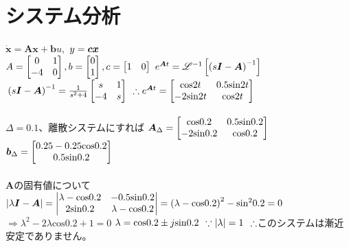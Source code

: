 \documentclass[12pt,a4paper]{article}
\begin{document}
\section{システム分析}
$\bm{\dot{x}}=\bm{Ax}+\bm{b}u,$
$\\y=\bm{cx}$
\\
$\\A=
\begin{bmatrix}
0 & 1\\
-4 & 0
\end{bmatrix},b=
\begin{bmatrix}
0\\
1
\end{bmatrix},c=
\begin{bmatrix}
1 & 0
\end{bmatrix}$
$\\e^{\bm{A}t}=\mathscr{L}^{-1}\left[\left(s\bm{I}-\bm{A}\right)^{-1}\right]$
$\\\left(s\bm{I}-\bm{A}\right)^{-1}=\frac{1}{s^2+4}
\begin{bmatrix}
s & 1\\
-4 & s
\end{bmatrix}$
$\\\therefore e^{\bm{A}t}=
\begin{bmatrix}
\mathrm{cos}2t & 0.5\mathrm{sin}2t\\
-2\mathrm{sin}2t & \mathrm{cos}2t
\end{bmatrix}$
\\
\\
$\Delta=0.1$、離散システムにすれば
$\\\bm{A}_\Delta=
\begin{bmatrix}
\mathrm{cos}0.2 & 0.5\mathrm{sin}0.2\\
-2\mathrm{sin}0.2 & \mathrm{cos}0.2
\end{bmatrix}$
$\\\bm{b}_\Delta=
\begin{bmatrix}
0.25-0.25\mathrm{cos}0.2\\
0.5\mathrm{sin}0.2
\end{bmatrix}$
\\
\\
$\bm{A}$の固有値について
$\\|\lambda\bm{I}-\bm{A}|=
\begin{vmatrix}
\lambda-\mathrm{cos}0.2 & -0.5\mathrm{sin}0.2\\
2\mathrm{sin}0.2 & \lambda-\mathrm{cos}0.2
\end{vmatrix}=\left(\lambda-\mathrm{cos}0.2\right)^2-\mathrm{sin}^20.2=0$
\\
$\Rightarrow \lambda^2-2\lambda\mathrm{cos}0.2+1=0$
$\\\lambda=\mathrm{cos}0.2\pm j\mathrm{sin}0.2$
$\\\because |\lambda|=1$
$\\\therefore$このシステムは漸近安定でありません。
\end{document}
